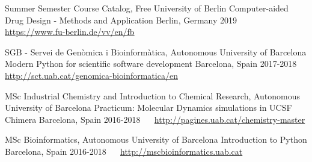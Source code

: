 


\begin{cventries}

  \cventry
    {Summer Semester Course Catalog, Free University of Berlin} %
    {Computer-aided Drug Design - Methods and Application} %
    {Berlin, Germany} %
    {2019} %
    {~~ \footnotesize{\href{https://www.fu-berlin.de/vv/en/fb}{\faGlobe \acvHeaderIconSep https://www.fu-berlin.de/vv/en/fb}}}

  \cventry
    {SGB - Servei de Genòmica i Bioinformàtica, Autonomous University of Barcelona} %
    {Modern Python for scientific software development} %
    {Barcelona, Spain} %
    {2017-2018} %
    {~~ \footnotesize{\href{http://sct.uab.cat/genomica-bioinformatica/en}{\faGlobe \acvHeaderIconSep http://sct.uab.cat/genomica-bioinformatica/en}}}

  \cventry
    {MSc Industrial Chemistry and Introduction to Chemical Research, Autonomous University of Barcelona} %
    {Practicum: Molecular Dynamics simulations in UCSF Chimera} %
    {Barcelona, Spain} %
    {2016-2018} %
    {~~ \footnotesize{\href{http://pagines.uab.cat/chemistry-master}{\faGlobe \acvHeaderIconSep http://pagines.uab.cat/chemistry-master}}}

  \cventry
    {MSc Bioinformatics, Autonomous University of Barcelona} %
    {Introduction to Python} %
    {Barcelona, Spain} %
    {2016-2018} %
    {~~ \footnotesize{\href{http://mscbioinformatics.uab.cat}{\faGlobe \acvHeaderIconSep http://mscbioinformatics.uab.cat}}}

\end{cventries}
